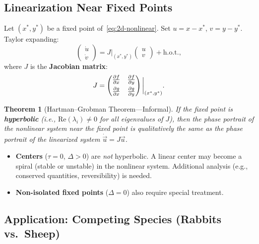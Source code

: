 \documentclass[11pt,letterpaper]{article}
\theoremstyle{definition}
\theoremstyle{plain}
\newtheorem{theorem}{Theorem}[section]
\theoremstyle{remark}
\newcommand{\xstar}{x^*}
\begin{document}
\subsection{Linearization Near Fixed Points}\label{sec:linearization}

Let $(\xstar, y^*)$ be a fixed point of~\eqref{eq:2d-nonlinear}.  Set
$u = x - \xstar$, $v = y - y^*$.  Taylor expanding:
\begin{equation}
  \begin{pmatrix} \dot{u} \\ \dot{v} \end{pmatrix}
  = J\bigg|_{(\xstar,y^*)} \begin{pmatrix} u \\ v \end{pmatrix}
  + \text{h.o.t.},
\end{equation}
where $J$ is the \textbf{Jacobian matrix}:
\begin{equation}\label{eq:jacobian}
  J = \begin{pmatrix}
    \pdv{f}{x} & \pdv{f}{y} \\[4pt]
    \pdv{g}{x} & \pdv{g}{y}
  \end{pmatrix}\bigg|_{(\xstar,y^*)}.
\end{equation}

\begin{theorem}[Hartman--Grobman Theorem---Informal]\label{thm:hartman-grobman}
If the fixed point is \textbf{hyperbolic} (i.e., $\text{Re}(\lambda_i)\neq 0$
for all eigenvalues of $J$), then the phase portrait of the nonlinear system
near the fixed point is \emph{qualitatively the same} as the phase portrait
of the linearized system $\dot{\vec{u}} = J\vec{u}$.
\end{theorem}

\begin{warningbox}
\begin{itemize}[leftmargin=2em]
\item \textbf{Centers} ($\tau=0$, $\Delta>0$) are \emph{not} hyperbolic.
      A linear center may become a spiral (stable or unstable) in the
      nonlinear system.  Additional analysis (e.g., conserved quantities,
      reversibility) is needed.
\item \textbf{Non-isolated fixed points} ($\Delta=0$) also require
      special treatment.
\end{itemize}
\end{warningbox}

\subsection{Application: Competing Species (Rabbits vs.\ Sheep)}
\end{document}

